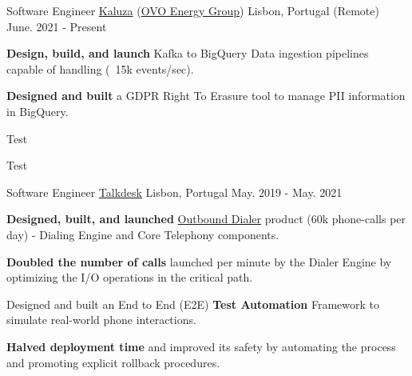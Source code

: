
\begin{cventries}
  \vspace{-2mm}
  \cventry
    {Software Engineer}
    {\href{https://www.kaluza.com/}{Kaluza} (\href{https://www.ovoenergy.com/}{OVO Energy Group})}
    {Lisbon, Portugal (Remote)}
    {June. 2021 - Present}
    {
      \begin{cvitems}
        \item \textbf{Design, build, and launch} Kafka to BigQuery Data ingestion pipelines capable of handling (~15k events/sec).
        \item \textbf{Designed and built} a GDPR Right To Erasure tool to manage PII information in BigQuery.
        \item Test
        \item Test
      \end{cvitems}
      \vspace{4mm}
    }

  \cventry
    {Software Engineer}
    {\href{https://www.talkdesk.com/}{Talkdesk}}
    {Lisbon, Portugal}
    {May. 2019 - May. 2021}
    {
      \begin{cvitems}
        \item \textbf{Designed, built, and launched} \href{https://www.youtube.com/watch?v=W9yJ6gi1ggA}{Outbound Dialer} product (60k phone-calls per day) - Dialing Engine and Core Telephony components.
        \item \textbf{Doubled the number of calls} launched per minute by the Dialer Engine by optimizing the I/O operations in the critical path.
        \item Designed and built an End to End (E2E) \textbf{Test Automation} Framework to simulate real-world phone interactions.
        \item \textbf{Halved deployment time} and improved its safety by automating the process and promoting explicit rollback procedures.
      \end{cvitems}
      \vspace{4mm}
    }
    

\end{cventries}

